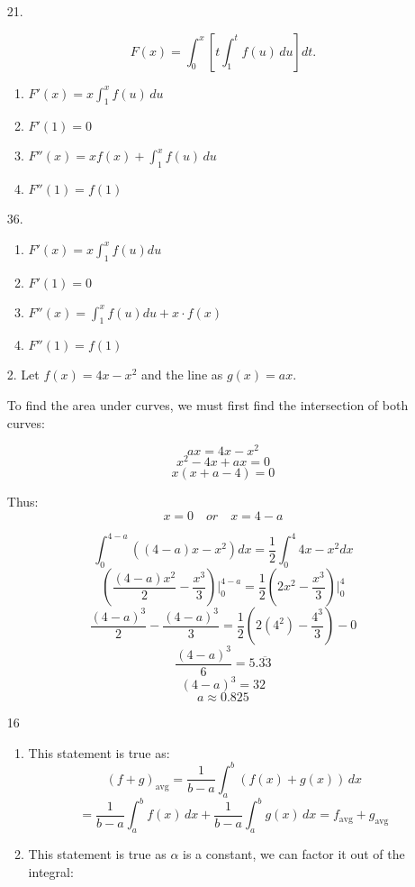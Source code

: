 \documentclass[12pt]{article}
\begin{document}
 
\begin{enumerate}[start=1,label={\bfseries. },leftmargin=1in]
\item [21. ]

    \[
    F(x) = \int_0^x \left[ t \int_1^t f(u) \, du \right] dt.
    \]
    
    \begin{enumerate}
    \item
    $F'(x) = x \int_1^x f(u) \, du$
    \item 
    $F'(1) = 0$
    \item
    $F''(x) = x f(x) + \int_1^x f(u) \, du$
    \item 
    $F''(1) = f(1)$
    \end{enumerate} 

\item [36. ]

\begin{enumerate}
    \item $F'(x) = x \int_1^x f(u)du$
    \item $F'(1) = 0$
    \item $F''(x) = \int_1^x f(u)du + x\cdot f(x)$
    \item $F''(1) = f(1)$
\end{enumerate}

\item [2. ]
Let $f(x) = 4x-x^2$ and the line as $g(x)=ax$. 

To find the area under curves, we must first find the intersection of both curves:

\[
ax= 4x-x^2
\]
\[
x^2 - 4x + ax =0
\]
\[
x(x+a-4) = 0
\]

Thus:
\[
x = 0 \quad or \quad x=4-a
\]

\[
\int_0^{4-a} ((4-a)x -x^2)dx = \frac{1}{2}\int_0^4 4x-x^2dx
\]
\[
\left(\frac{(4-a)x^2}{2} - \frac{x^3}{3}\right) \Bigg|_0^{4-a} = \frac{1}{2}\left(2x^2 - \frac{x^3}{3}\right) \Bigg|_0^{4}
\]
\[
\frac{(4-a)^3}{2} - \frac{(4-a)^3}{3} = \frac{1}{2} \left(2(4^2) - \frac{4^3}{3}\right) - 0
\]
\[
\frac{(4-a)^3}{6} = 5.\overline{33}
\]
\[
(4-a)^3 = 32
\]
\[
a \approx 0.825
\]

\item [16]
\begin{enumerate}
    \item This statement is true as:
\[
(f + g)_{\text{avg}} = \frac{1}{b - a} \int_a^b (f(x) + g(x)) \, dx 
\]
\[
= \frac{1}{b - a} \int_a^b f(x) \, dx + \frac{1}{b - a} \int_a^b g(x) \, dx = f_{\text{avg}} + g_{\text{avg}}
\]
\item This statement is true as \(\alpha\) is a constant, we can factor it out of the integral:


\end{enumerate}
\end{enumerate}
\end{document}
